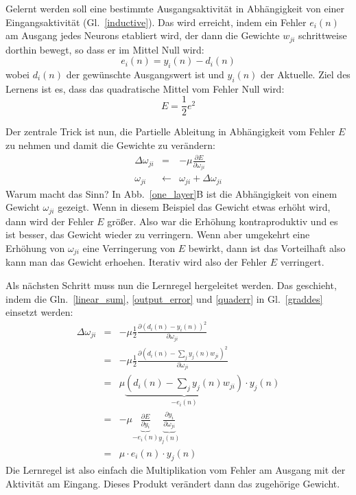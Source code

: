 \documentclass[12pt]{article}
\begin{document}
Gelernt werden soll eine bestimmte Ausgangsaktivität in Abhängigkeit von einer Eingangsaktivität (Gl.~\ref{inductive}).
Das wird erreicht, indem ein Fehler $e_i(n)$ am Ausgang jedes Neurons etabliert wird, der dann die Gewichte $w_{ji}$
schrittweise dorthin bewegt, so dass er im Mittel Null wird:
\begin{equation}
  e_i(n) = y_i(n) - d_i(n) \label{output_error}
\end{equation}
wobei $d_i(n)$ der gewünschte Ausgangswert ist und $y_i(n)$ der Aktuelle.
Ziel des Lernens ist es, dass das quadratische Mittel vom Fehler Null wird:
\begin{equation}
  E = \frac{1}{2} e^2 \label{quaderr}
\end{equation}

Der zentrale Trick ist nun, die Partielle Ableitung in Abhängigkeit vom Fehler $E$ zu nehmen
und damit die Gewichte zu verändern:
\begin{eqnarray}
  \Delta\omega_{ji} & = & - \mu \frac{\partial E}{\partial \omega_{ji}} \label{graddes} \\
  \omega_{ji} & \leftarrow & \omega_{ji} + \Delta\omega_{ji}
\end{eqnarray}
Warum macht das Sinn? In Abb.~\ref{one_layer}B ist die Abhängigkeit von einem Gewicht
$\omega_{ji}$ gezeigt. Wenn in diesem Beispiel das Gewicht etwas erhöht wird, dann
wird der Fehler $E$ größer. Also war die Erhöhung kontraproduktiv und es ist besser,
das Gewicht wieder zu verringern. Wenn aber umgekehrt eine Erhöhung von $\omega_{ji}$ eine
Verringerung von $E$ bewirkt, dann ist das Vorteilhaft also kann man das Gewicht erhoehen.
Iterativ wird also der Fehler $E$ verringert.

Als nächsten Schritt muss nun die Lernregel hergeleitet werden. Das geschieht, indem die
Gln.~\ref{linear_sum}, \ref{output_error} und \ref{quaderr} in Gl.~\ref{graddes} einsetzt werden:
\begin{eqnarray}
  \Delta\omega_{ji}
   & = & - \mu \frac{1}{2} \frac{\partial ( d_i(n) - y_i(n) )^2 }{\partial \omega_{ji}} \\
   & = & - \mu \frac{1}{2} \frac{\partial \left( d_i(n) - \sum_j y_j(n) w_{ji} \right)^2 }{\partial \omega_{ji}} \\
  & = & \mu \underbrace{\left(d_i(n) - \sum_j y_j(n) w_{ji}\right)}_{-e_i(n)} \cdot y_j(n) \\
   & = & - \mu \underbrace{\frac{\partial E}{\partial y_i}}_{-e_i(n)} \underbrace{\frac{\partial y_i}{\partial \omega_{ji}}}_{y_j(n)} \label{chainrule}\\
  & = & \mu \cdot e_i(n) \cdot y_j(n)
\end{eqnarray}
Die Lernregel ist also einfach die Multiplikation vom Fehler am Ausgang mit der Aktivität am Eingang. Dieses Produkt verändert
dann das zugehörige Gewicht.
\end{document}
